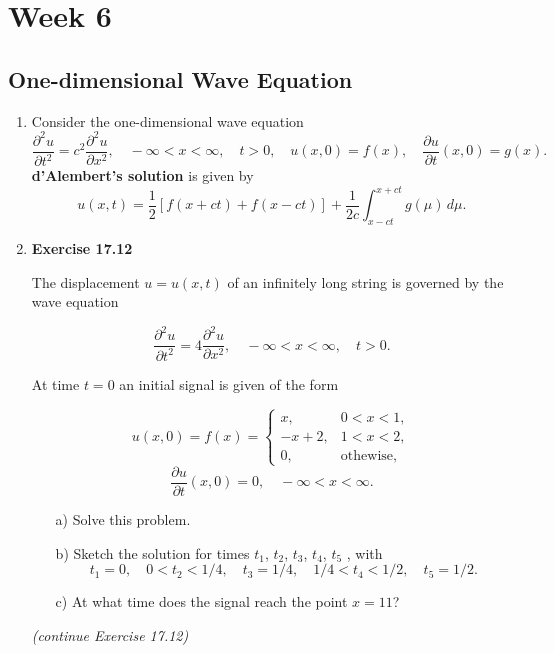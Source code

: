 \chapter{Week 6}
\setcounter{weekpage}{1}
\thispagestyle{plainweek}

\section{One-dimensional Wave Equation}

\begin{enumerate}


\item Consider the one-dimensional wave equation
\[\frac{\partial^{2} u}{\partial t^{2}} = c^{2} \frac{\partial^{2} u}{\partial x^{2}}, \quad -\infty<x<\infty, \quad t>0, \quad u(x,0)=f(x), \quad \frac{\partial u}{\partial t}(x,0)=g(x).\]
\textbf{d'Alembert's solution} is given by
\[u(x,t)= \frac{1}{2}[f(x+ct)+f(x-ct)] + \frac{1}{2c} \int _{x-ct}^{x+ct} g(\mu)\, d\mu.\]


\item \textbf{Exercise 17.12}

The displacement $u = u(x, t)$ of an infinitely long string is governed by the wave equation

\[\frac{\partial^{2} u}{\partial t^{2}} = 4 \frac{\partial^{2} u}{\partial x^{2}}, \quad -\infty<x<\infty, \quad t>0.\]

At time $t = 0$ an initial signal is given of the form

\[
u(x,0)=f(x)=
\begin{cases}
    x , & 0<x<1, \\
    -x+2, & 1<x<2, \\
    0, & \text{othewise},
\end{cases}
\]
\[\frac{\partial u}{\partial t}(x,0)=0, \quad -\infty<x<\infty.\]
\begin{enumerate}
    \item[a)] Solve this problem.
    \item[b)] Sketch the solution for times $t _{1}$, $t _{2}$, $t _{3}$, $t _{4}$, $t _{5}$ , with
    \[t_{1}=0, \quad 0<t_{2}<1/4, \quad t_{3}=1/4, \quad 1/4<t_{4}<1/2, \quad t_{5}=1/2.\]
    \item[c)] At what time does the signal reach the point $x = 11$?
\end{enumerate}

\newpage

\textit{(continue Exercise 17.12)}


\end{enumerate}
